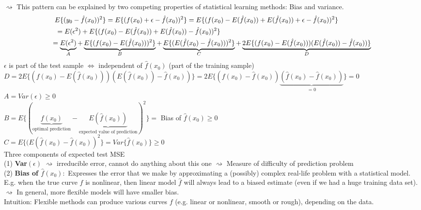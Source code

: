 \documentclass[11pt,a4paper,numbers=endperiod]{scrartcl}
\begin{document}
$\rightsquigarrow$ This pattern can be explained by two competing properties of statistical learning methods: Bias and variance.
\begin{align*}
	E \{(y_0 - \hat{f}(x_0))^2\} = E\{(f(x_0) + \epsilon - \hat{f}(x_0))^2\} = E \{(f(x_0) - E(\hat{f}(x_0)) + E(\hat{f}(x_0)) + \epsilon - \hat{f}(x_0))^2\} \hspace*{17mm}\\ 
	= E(\epsilon^2) + E\{(f(x_0) - E(\hat{f}(x_0)) + E(\hat{f}(x_0)) - \hat{f}(x_0))^2\} \hspace*{78.3mm}\\
	 = \underbrace{E(\epsilon^2)}_{A} + \underbrace{E\{(f(x_0) - E(\hat{f}(x_0)))^2\}}_{B} + \underbrace{E\{(E(\hat{f}(x_0) - \hat{f}(x_0)))^2\}}_{C}  + \underbrace{2E\{(f(x_0) - E(\hat{f}(x_0))) (E(\hat{f}(x_0)) - \hat{f}(x_0))\}}_{D}
\end{align*}
$\epsilon$ is part of the test sample $\Leftrightarrow$ independent of $\hat{f}(x_0)$ (part of the training sample)\\

$D = 2E\{(f(x_0) - E(\hat{f}(x_0))) (E(\hat{f}(x_0)) - \hat{f}(x_0))\} = 2E\{(f(x_0) - \hat{f}(x_0)) \underbrace{(\hat{f}(x_0) - \hat{f}(x_0))}_{=0}\} = 0$\\
$A = Var(\epsilon) \geq 0$\\
$B = E\{(\underbrace{f(x_0)}_{\text{optimal prediction}} - \underbrace{E(\hat{f}(x_0))}_{\text{expected value of prediction}})^2\} =$ Bias of $\hat{f}(x_0) \geq 0$\\

$C = E\{(E(\hat{f}(x_0) - \hat{f}(x_0))^2\} = Var \{\hat{f}(x_0)\} \geq 0$\\

Three components of expected test MSE\\
(1) \textbf{Var$(\epsilon)$} $\rightsquigarrow$ irreducible error, cannot do anything about this one $\rightsquigarrow$ Measure of difficulty of prediction problem\\
(2) \textbf{Bias of $\hat{f}(x_0):$} Expresses the error that we make by approximating a (possibly) complex real-life problem with a statistical model. E.g. when the true curve $f$ is nonlinear, then linear model $\hat{f}$ will always lead to a biased estimate (even if we had a huge training data set).\\
$\rightsquigarrow$ In general, more flexible models will have smaller bias.\\
Intuition: Flexible methods can produce various curves $f$ (e.g. linear or nonlinear, smooth or rough), depending on the data. 
\end{document}

